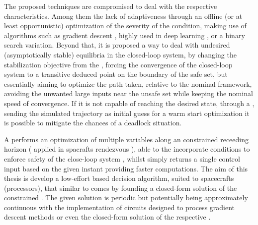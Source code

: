 The proposed techniques are compromised to deal with the respective characteristics. Among them the lack of adaptiveness through an offline (or at least opportunistic) optimization of the severity of the  condition, making use of algorithms  such as gradient descent \cite{ruder2016overview}, highly used in deep learning \cite{tian2023recent}, or a binary search \cite{lin2019binary} variation. Beyond that, it is proposed a way to deal with undesired (asymptotically stable) equilibria in the closed-loop system, by changing the stabilization objective from the , forcing the convergence of the closed-loop system to a transitive deduced point on the boundary of the safe set, but essentially aiming to optimize the path taken, relative to the nominal  framework, avoiding the unwanted large inputs near the unsafe set while keeping the nominal speed of convergence. If it is not capable of reaching the desired state, through a , sending the simulated trajectory as initial guess for a warm start optimization it is possible to mitigate the chances of a deadlock situation. 



A  performs an optimization of multiple variables along an constrained receeding horizon ( applied in spacrafts rendezvous \cite{hartley2015tutorial, kaczmarek2023autonomous}), able to the incorporate  conditions to enforce safety of the close-loop system  \cite{grandia2021multi}, whilst  simply returns a single control input based on the given instant providing  faster computations.
The aim of this thesis is develop a low-effort  based decision algorithm, suited to spacecrafts (processors), that similar to \cite{matias2025hybrid, reis2020control} comes by founding a closed-form solution of the constrained . The given solution is periodic but potentially being approximately continuous with the implementation of circuits designed to process gradient descent methods or even the closed-form solution of the respective  \cite{hao2025analysis}.

